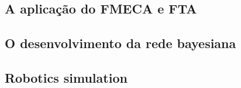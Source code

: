 \subsection{A aplicação do FMECA e FTA}

\subsection{O desenvolvimento da rede bayesiana}

\subsection{Robotics simulation}



